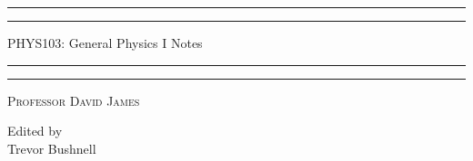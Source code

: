 \documentclass{package/notes}
\begin{document}
	\begin{titlepage} %
		
		\centering %
		
		\scshape %
		
		\vspace*{\baselineskip} %
		
		
		\rule{\textwidth}{1.6pt}\vspace*{-\baselineskip}\vspace*{2pt} %
		\rule{\textwidth}{0.4pt} %
		
		\vspace{0.75\baselineskip} %
		
		{\huge PHYS103: General Physics I Notes} %
		
		\vspace{0.75\baselineskip} %
		
		\rule{\textwidth}{0.4pt}\vspace*{-\baselineskip}\vspace{3.2pt} %
		\rule{\textwidth}{1.6pt} %
		
		\vspace{2\baselineskip} %
		
		
		\LARGE{} 
		
		\vspace*{3\baselineskip} %
		
		
		
		\vspace{0.5\baselineskip} 
		
		{\scshape   \LARGE Professor David James\\ } %
		
		\vspace{0.5\baselineskip}
		
		\vfill 
		
		
		
		\vspace{0.3\baselineskip} 
		
		
		{\large Edited by\\  Trevor Bushnell} 
		
	\end{titlepage}
	\tableofcontents
\end{document}
